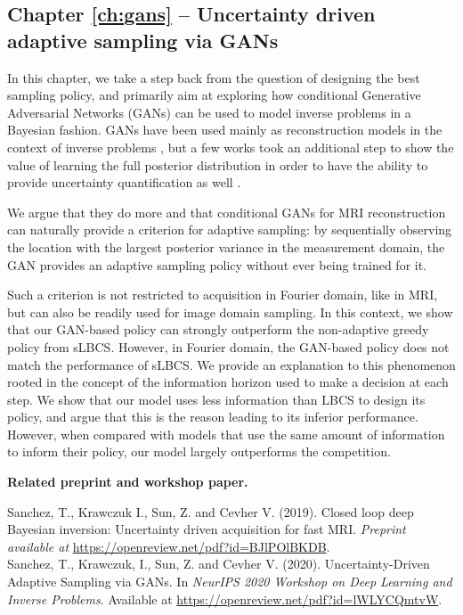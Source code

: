 \subsection*{Chapter \ref{ch:gans} -- Uncertainty driven adaptive sampling via GANs}
In this chapter, we take a step back from the question of designing the best sampling policy, and primarily aim at exploring how conditional Generative Adversarial Networks (GANs) \citep{goodfellow2014generative} can be used to model inverse problems in a Bayesian fashion. 
GANs have been used mainly as reconstruction models in the context of inverse problems \citep{yang_dagan_2018,chen2022ai}, but a few works took an additional step to show the value of learning the full posterior distribution in order to have the ability to provide uncertainty quantification as well \citep{adler2018deep}. 

We argue that they do more and that conditional GANs for MRI reconstruction can naturally provide a criterion for adaptive sampling: by sequentially observing the location with the largest posterior variance in the measurement domain, the GAN provides an adaptive sampling policy without ever being trained for it.

Such a criterion is not restricted to acquisition in Fourier domain, like in MRI, but can also be readily used for image domain sampling. In this context, we show that our GAN-based policy can strongly outperform the non-adaptive greedy policy from sLBCS. However, in Fourier domain, the GAN-based policy does not match the performance of sLBCS. We provide an explanation to this phenomenon rooted in the concept of the information horizon used to make a decision at each step. We show that our model uses less information than LBCS to design its policy, and argue that this is the reason leading to its inferior performance. However, when compared with models that use the same amount of information to inform their policy, our model largely outperforms the competition.

\textbf{Related preprint and workshop paper.}
\begin{adjustwidth}{.5cm}{}

Sanchez, T., Krawczuk I., Sun, Z. and Cevher V. (2019). Closed loop deep Bayesian inversion: Uncertainty driven acquisition for fast MRI. \textit{Preprint available at} \url{https://openreview.net/pdf?id=BJlPOlBKDB}.\\[0.4cm]
Sanchez, T., Krawczuk, I., Sun, Z. and Cevher V. (2020). Uncertainty-Driven Adaptive Sampling via GANs. In \textit{NeurIPS 2020 Workshop on Deep Learning and Inverse Problems}. Available at \url{https://openreview.net/pdf?id=lWLYCQmtvW}.
\end{adjustwidth}

